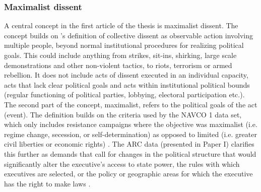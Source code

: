 \subsubsection{Maximalist dissent} \label{Maximalist dissent}


A central concept in the first article of the thesis is maximalist dissent. The
concept builds on \citet{TillyCharles1978Fmtr}'s definition of collective
dissent as observable action involving multiple people, beyond normal
institutional procedures for realizing political goals. This could include
anything from strikes, sit-ins, shirking, large scale demonstrations and other
non-violent tactics, to riots, terrorism or armed rebellion. It does not include
acts of dissent executed in an individual capacity, acts that lack clear
political goals and acts within institutional political bounds (regular
functioning of political parties, lobbying, electoral participation etc.). The
second part of the concept, maximalist, refers to the political goals of the act
(event). The definition builds on the criteria used by the NAVCO 1 data set,
which only includes resistance campaigns where the objective was maximalist
(i.e. regime change, secession, or self-determination) as opposed to limited
(i.e. greater civil liberties or economic rights)
\citep{DVN/0UZOTX/B4RH7S_2019}. The ARC data (presented in Paper I) clarifies
this further as demands that call for changes in the political structure that
would significantly alter the executive’s access to state power, the rules with
which executives are selected, or the policy or geographic areas for which the
executive has the right to make laws \citep{Butcher_2022}.

